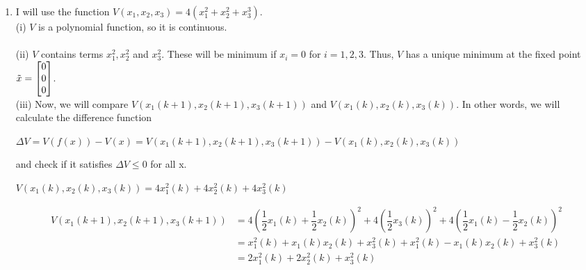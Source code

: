 \documentclass[12pt,a4paper, margin=1in]{article}
\begin{document}
\begin{enumerate}
\begin{enumerate}
        \end{enumerate}
        

\newpage



        
    \item %
        I will use the function $V(x_1, x_2, x_3) = 4(x_1^2 + x_2^2 + x_3^3)$. \\

        (i) $V$ is a polynomial function, so it is continuous. \\ \\
        (ii) $V$ contains terms $x_1^2, x_2^2$ and $x_3^2$. These will be minimum if $x_i = 0$ for $i = 1, 2, 3$. Thus, $V$ has a  unique minimum at the fixed point $\Tilde{x} = \begin{bmatrix}
            0 \\ 0 \\ 0
        \end{bmatrix}$. \\
        
        (iii) Now, we will compare $V(x_1(k+1), x_2(k+1), x_3(k+1))$ and  $V(x_1(k), x_2(k), x_3(k))$. In other words, we will calculate the difference function
        \begin{center}
            $\Delta V = V(f(x)) - V(x) = V(x_1(k+1), x_2(k+1), x_3(k+1)) - V(x_1(k), x_2(k), x_3(k))$
        \end{center}
        and check if it satisfies $\Delta V \leq 0$ for all x. 

        \begin{center}
            $V(x_1(k), x_2(k), x_3(k)) = 4x_1^2(k) + 4x_2^2(k) + 4x_3^2(k)$ 
        \end{center}

            \begin{center}
            \begin{equation*}
            \begin{split}
                    V(x_1(k+1), x_2(k+1), x_3(k+1)) & = 4 (\dfrac{1}{2}x_1(k) + \dfrac{1}{2}x_2(k))^2 + 4(\dfrac{1}{2}x_3(k))^2 + 4 (\dfrac{1}{2}x_1(k) - \dfrac{1}{2}x_2(k))^2 \\ 
                    & = x_1^2(k) + x_1(k)x_2(k) + x_3^2(k) + x_1^2(k) - x_1(k)x_2(k) + x_3^2(k) \\
                    & = 2x_1^2(k) + 2x_2^2(k) + x_3^2(k)
            \end{split}
            \end{equation*}    
            \end{center}


\end{enumerate}
\end{document}
